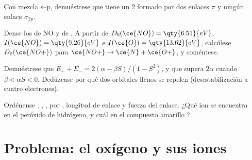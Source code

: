 \begin{exercise}[$\star\star$]\label{exo:b2:diatomic-mos:9}
Con mezcla s--p, demuéstrese que  tiene un  2 formado por dos enlaces $\pi$ y ningún
enlace $\sigma_{2p}$.
\end{exercise}

\begin{exercise}[$\star\star\star$]\label{exo:b2:diatomic-mos:10}
Dense los  de NO y de . A partir de $D_0(\ce{NO}) = \qty{6.51}{eV}$, $I(\ce{NO}) =
\qty{9.26}{eV}$ e $I(\ce{O}) = \qty{13.62}{eV}$, calcúlese $D_0(\ce{NO+})$ para $\ce{NO+} \to
\ce{N} + \ce{O+}$, y coméntese.
\end{exercise}

\begin{exercise}[$\star\star\star$]\label{exo:b2:diatomic-mos:11}
Demuéstrese que $E_+ + E_- = 2(\alpha - \beta S)/(1 - S^2)$, y que supera $2\alpha$ cuando
$\beta < \alpha S < 0$. Dedúzcase por qué dos orbitales llenos se repelen (desestabilización a cuatro
electrones).
\end{exercise}

\begin{exercise}[$\star\star\star$]\label{exo:b2:diatomic-mos:12}
Ordénense , , ,  por , longitud de enlace y fuerza
del enlace. ¿Qué ion se encuentra en el peróxido de hidrógeno, y cuál en el compuesto
amarillo ?
\end{exercise}

\section{Problema: el oxígeno y sus iones}

